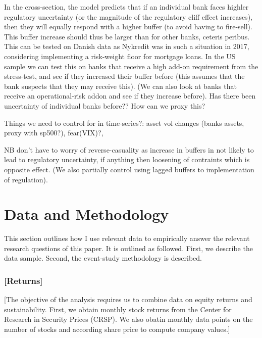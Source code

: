 \documentclass[11pt]{article}
\begin{document}
In the cross-section, the model predicts that if an individual bank faces highler regulatory uncertainty (or the magnitude of the regulatory cliff effect increases), then they will equally respond with a higher buffer (to avoid having to fire-sell). This buffer increase should thus be larger than for other banks, ceteris peribus. This can be tested on Danish data as Nykredit was in such a situation in 2017, considering implementing a risk-weight floor for mortgage loans. In the US sample we can test this on banks that receive a high add-on requirement from the stress-test, and see if they increased their buffer before (this assumes that the bank suspects that they may receive this). (We can also look at banks that receive an operational-risk addon and see if they increase before). Has there been uncertainty of individual banks before?? How can we proxy this?

Things we need to control for in time-series?: asset vol changes (banks assets, proxy with sp500?), fear(VIX)?,

NB don't have to worry of reverse-casuality as increase in buffers in not likely to lead to regulatory uncertainty, if anything then loosening of contraints which is opposite effect. (We also partially control using lagged buffers to implementation of regulation).

\section{Data and Methodology}

This section outlines how I use relevant data to empirically answer the relevant research questions of this paper. It is outlined as followed. First, we describe the data sample. Second, the event-study methodology is described.

\subsubsection*{[Returns]}

[The objective of the analysis requires us to combine data on equity returns and sustainability. First, we obtain monthly stock returns from the Center for Research in Security Prices (CRSP). We also obatin monthly data points on the number of stocks and according share price to compute company values.]
\end{document}
